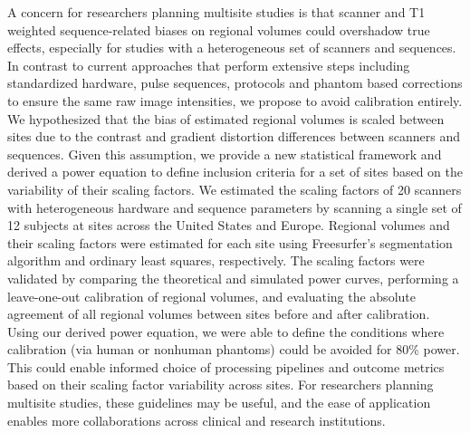
A concern for researchers planning multisite studies is that scanner and T1 weighted sequence-related biases on regional volumes could overshadow true effects, especially for studies with a heterogeneous set of scanners and sequences. In contrast to current approaches that perform extensive steps including standardized hardware, pulse sequences, protocols and phantom based corrections to ensure the same raw image intensities, we propose to avoid calibration entirely.  We hypothesized that the bias of estimated regional volumes is scaled between sites due to the contrast and gradient distortion differences between scanners and sequences. Given this assumption, we provide a new statistical framework and derived a power equation to define inclusion criteria for a set of sites based on the variability of their scaling factors. We estimated the scaling factors of 20 scanners with heterogeneous hardware and sequence parameters by scanning a single set of 12 subjects at sites across the United States and Europe. Regional volumes and their scaling factors were estimated for each site using Freesurfer's segmentation algorithm and ordinary least squares, respectively. The scaling factors were validated by comparing the theoretical and simulated power curves, performing a leave-one-out calibration of regional volumes, and evaluating the absolute agreement of all regional volumes between sites before and after calibration. Using our derived power equation, we were able to define the conditions where calibration (via human or nonhuman phantoms) could be avoided for 80\% power. This could enable informed choice of processing pipelines and outcome metrics based on their scaling factor variability across sites. For researchers planning multisite studies, these guidelines may be useful, and the ease of application enables more collaborations across clinical and research institutions.